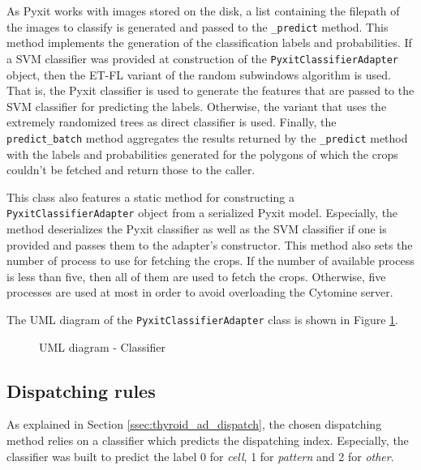 As Pyxit works with images stored on the disk, a list containing the filepath of the images to classify is generated and passed to the \texttt{\_predict} method. This method implements the generation of the classification labels and probabilities. If a SVM classifier was provided at construction of the \texttt{PyxitClassifierAdapter} object, then the ET-FL variant of the random subwindows algorithm is used. That is, the Pyxit classifier is used to generate the features that are passed to the SVM classifier for predicting the labels. Otherwise, the variant that uses the extremely randomized trees as direct classifier is used. Finally, the \texttt{predict\_batch} method aggregates the results returned by the \texttt{\_predict} method with the labels and probabilities generated for the polygons of which the crops couldn't be fetched and return those to the caller.

This class also features a static method for constructing a \texttt{PyxitClassifierAdapter} object from a serialized Pyxit model. Especially, the method deserializes the Pyxit classifier as well as the SVM classifier if one is provided and passes them to the adapter's constructor. This method also sets the number of process to use for fetching the crops. If the number of available process is less than five, then all of them are used to fetch the crops. Otherwise, five processes are used at most in order to avoid overloading the Cytomine server.

The UML diagram of the \texttt{PyxitClassifierAdapter} class is shown in Figure \ref{fig:uml_cyto_classifiers}.

\begin{figure}
	\center
	\caption{UML diagram - Classifier}
	\label{fig:uml_cyto_classifiers}
\end{figure}

\subsection{Dispatching rules}

As explained in Section \ref{ssec:thyroid_ad_dispatch}, the chosen dispatching method relies on a classifier which predicts the dispatching index. Especially, the classifier was built to predict the label 0 for \textit{cell}, 1 for \textit{pattern} and 2 for \textit{other}.


